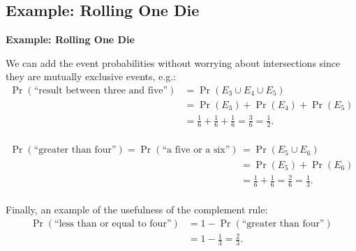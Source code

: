 \documentclass[compress]{beamer}        %
\makeatletter
\newcommand{\tcb}{\textcolor{beamer@blendedblue}}
\makeatother
\begin{document}
\subsection{Example: Rolling One Die}
\begin{frame}{\bf \tcb{Example: Rolling One Die}}

We can add the event probabilities without worrying about intersections since they are mutually exclusive events, e.g.:\\[-0.3cm]
\begin{align*}
\Pr(\text{``result between three and five''}) &= \Pr(E_3 \cup E_4 \cup E_5) \\&= \Pr(E_3) + \Pr(E_4) + \Pr(E_5) \\
&= \tfrac{1}{6} + \tfrac{1}{6} + \tfrac{1}{6} = \tfrac{3}{6} = \tfrac{1}{2}.\\[-1.1cm]
\end{align*}

\begin{align*}
\Pr(\text{``greater than four''}) = \Pr(\text{``a five or a six''}) &= \Pr(E_5 \cup E_6) \\&= \Pr(E_5) + \Pr(E_6) \\
&= \tfrac{1}{6} + \tfrac{1}{6} = \tfrac{2}{6} = \tfrac{1}{3}.\\[-0.1cm]
\end{align*}

Finally, an example of the usefulness of the complement rule:
\begin{align*}
\Pr(\text{``less than or equal to four''}) &= 1 - \Pr(\text{``greater than four''}) \\
&= 1 - \tfrac{1}{3} = \tfrac{2}{3}.
\end{align*}

\end{frame}
\end{document}
